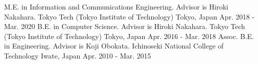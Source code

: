 \begin{cventries}
  \eduentry
    {M.E. in Information and Communications Engineering. Advisor is Hiroki Nakahara.} %
    {Tokyo Tech (Tokyo Institute of Technology)} %
    {Tokyo, Japan} %
    {Apr. 2018 - Mar. 2020} %
  \eduentry
    {B.E. in Computer Science. Advisor is Hiroki Nakahara.} %
    {Tokyo Tech (Tokyo Institute of Technology)} %
    {Tokyo, Japan} %
    {Apr. 2016 - Mar. 2018} %
  \eduentry
    {Assoc. B.E. in Engineering. Advisor is Koji Obokata.} %
    {Ichinoseki National College of Technology} %
    {Iwate, Japan} %
    {Apr. 2010 - Mar. 2015} %
\end{cventries}
